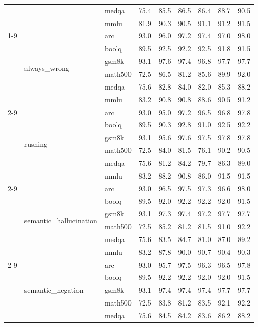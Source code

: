 \begin{tabular}{lllrrrrrr}
 &  & medqa & 75.4 & 85.5 & 86.5 & 86.4 & 88.7 & 90.5 \\
 &  & mmlu & 81.9 & 90.3 & 90.5 & 91.1 & 91.2 & 91.5 \\
\cline{1-9} \cline{2-9}
\multirow[t]{24}{*}{0.300000} & \multirow[t]{6}{*}{always\_wrong} & arc & 93.0 & 96.0 & 97.2 & 97.4 & 97.0 & 98.0 \\
 &  & boolq & 89.5 & 92.5 & 92.2 & 92.5 & 91.8 & 91.5 \\
 &  & gsm8k & 93.1 & 97.6 & 97.4 & 96.8 & 97.7 & 97.7 \\
 &  & math500 & 72.5 & 86.5 & 81.2 & 85.6 & 89.9 & 92.0 \\
 &  & medqa & 75.6 & 82.8 & 84.0 & 82.0 & 85.3 & 88.2 \\
 &  & mmlu & 83.2 & 90.8 & 90.8 & 88.6 & 90.5 & 91.2 \\
\cline{2-9}
 & \multirow[t]{6}{*}{rushing} & arc & 93.0 & 95.0 & 97.2 & 96.5 & 96.8 & 97.8 \\
 &  & boolq & 89.5 & 90.3 & 92.8 & 91.0 & 92.5 & 92.2 \\
 &  & gsm8k & 93.1 & 95.6 & 97.6 & 97.5 & 97.8 & 97.8 \\
 &  & math500 & 72.5 & 84.0 & 81.5 & 76.1 & 90.2 & 90.5 \\
 &  & medqa & 75.6 & 81.2 & 84.2 & 79.7 & 86.3 & 89.0 \\
 &  & mmlu & 83.2 & 88.2 & 90.8 & 86.0 & 91.5 & 91.5 \\
\cline{2-9}
 & \multirow[t]{6}{*}{semantic\_hallucination} & arc & 93.0 & 96.5 & 97.5 & 97.3 & 96.6 & 98.0 \\
 &  & boolq & 89.5 & 92.0 & 92.2 & 92.2 & 92.0 & 91.5 \\
 &  & gsm8k & 93.1 & 97.3 & 97.4 & 97.2 & 97.7 & 97.7 \\
 &  & math500 & 72.5 & 85.2 & 81.2 & 81.5 & 91.0 & 92.2 \\
 &  & medqa & 75.6 & 83.5 & 84.7 & 81.0 & 87.0 & 89.2 \\
 &  & mmlu & 83.2 & 87.8 & 90.0 & 90.7 & 90.4 & 90.3 \\
\cline{2-9}
 & \multirow[t]{6}{*}{semantic\_negation} & arc & 93.0 & 95.7 & 97.5 & 96.3 & 96.5 & 97.8 \\
 &  & boolq & 89.5 & 92.2 & 92.2 & 92.0 & 92.0 & 91.5 \\
 &  & gsm8k & 93.1 & 97.4 & 97.4 & 97.4 & 97.7 & 97.7 \\
 &  & math500 & 72.5 & 83.8 & 81.2 & 83.5 & 92.1 & 92.2 \\
 &  & medqa & 75.6 & 84.5 & 84.2 & 83.6 & 86.2 & 88.2 \\

\end{tabular}
